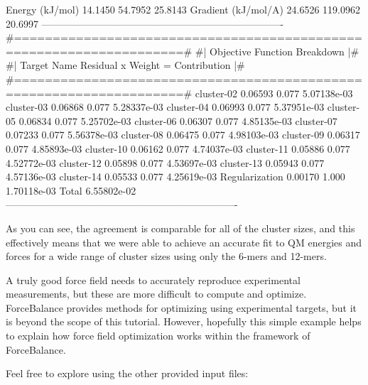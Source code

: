 \begin{DoxyVerb}
    Energy (kJ/mol)                14.1450       54.7952     25.8143%
    Gradient (kJ/mol/A)            24.6526      119.0962     20.6997%
-------------------------------------------------------------------------
#====================================================================#
#|                   Objective Function Breakdown                   |#
#|   Target Name              Residual  x  Weight  =  Contribution  |#
#====================================================================#
cluster-02                     0.06593      0.077      5.07138e-03 
cluster-03                     0.06868      0.077      5.28337e-03 
cluster-04                     0.06993      0.077      5.37951e-03 
cluster-05                     0.06834      0.077      5.25702e-03 
cluster-06                     0.06307      0.077      4.85135e-03 
cluster-07                     0.07233      0.077      5.56378e-03 
cluster-08                     0.06475      0.077      4.98103e-03 
cluster-09                     0.06317      0.077      4.85893e-03 
cluster-10                     0.06162      0.077      4.74037e-03 
cluster-11                     0.05886      0.077      4.52772e-03 
cluster-12                     0.05898      0.077      4.53697e-03 
cluster-13                     0.05943      0.077      4.57136e-03 
cluster-14                     0.05533      0.077      4.25619e-03 
Regularization                 0.00170      1.000      1.70118e-03 
Total                                                  6.55802e-02 
----------------------------------------------------------------------
\end{DoxyVerb}


\-As you can see, the agreement is comparable for all of the cluster sizes, and this effectively means that we were able to achieve an accurate fit to \-Q\-M energies and forces for a wide range of cluster sizes using only the 6-\/mers and 12-\/mers.

\-A truly good force field needs to accurately reproduce experimental measurements, but these are more difficult to compute and optimize. \-Force\-Balance provides methods for optimizing using experimental targets, but it is beyond the scope of this tutorial. \-However, hopefully this simple example helps to explain how force field optimization works within the framework of \-Force\-Balance.

\-Feel free to explore using the other provided input files\-:

